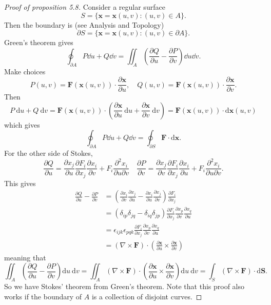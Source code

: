 \begin{proof}[Proof of proposition 5.8]
    Consider a regular surface 
    \[
        S = \{\mathbf{x}=\mathbf{x}(u,v): (u,v)\in A\}.
    \]
    Then the boundary is (see Analysis and Topology)
    \[
        \partial S = \{\mathbf{x}=\mathbf{x}(u,v): (u,v)\in \partial A\}.
    \]
    Green's theorem gives 
    \[
        \oint_{\partial A} P\dd u+Q\dd v = \iint_{A} \left( \frac{\partial Q}{\partial u}-\frac{\partial P}{\partial v}   \right)\dd u\dd v.
    \]
    Make choices 
    \[
        P(u,v) = \mathbf{F}(\mathbf{x}(u,v)) \cdot \frac{\partial \mathbf{x}}{\partial u},\quad Q(u,v) = \mathbf{F}(\mathbf{x}(u,v)) \cdot \frac{\partial \mathbf{x}}{\partial v}.  
    \]
    Then 
    \[
        P \mathrm{~d} u+Q \mathrm{~d} v=\mathbf{F}(\mathbf{x}(u, v)) \cdot\left(\frac{\partial \mathbf{x}}{\partial u} \mathrm{~d} u+\frac{\partial \mathbf{x}}{\partial v} \mathrm{~d} v\right)=\mathbf{F}(\mathbf{x}(u, v)) \cdot \mathrm{d} \mathbf{x}(u, v)
    \]
    which gives 
    \[
        \oint_{\partial A} P\dd u+Q\dd v = \oint_{\partial S} \mathbf{F} \cdot \mathrm{d}\mathbf{x}.
    \]
    For the other side of Stokes, 
    \[
        \frac{\partial Q}{\partial u}=\frac{\partial x_{j}}{\partial u} \frac{\partial F_{i}}{\partial x_{j}} \frac{\partial x_{i}}{\partial v}+F_{i} \frac{\partial^{2} x_{i}}{\partial u \partial v}\quad \frac{\partial P}{\partial v}=\frac{\partial x_{j}}{\partial v} \frac{\partial F_{i}}{\partial x_{j}} \frac{\partial x_{i}}{\partial u}+F_{i} \frac{\partial^{2} x_{i}}{\partial u \partial v}.
    \]
    This gives
    \begin{align*}
        \frac{\partial Q}{\partial u}-\frac{\partial P}{\partial v} &=\left(\frac{\partial x_{i}}{\partial v} \frac{\partial x_{j}}{\partial u}-\frac{\partial x_{i}}{\partial u} \frac{\partial x_{j}}{\partial v}\right) \frac{\partial F_{i}}{\partial x_{j}} \\
        &=\left(\delta_{i p} \delta_{j q}-\delta_{i q} \delta_{j p}\right) \frac{\partial F_{i}}{\partial x_{j}} \frac{\partial x_{p}}{\partial v} \frac{\partial x_{q}}{\partial u} \\
        &=\epsilon_{i j k} \epsilon_{p q k} \frac{\partial F_{i}}{\partial x_{j}} \frac{\partial x_{p}}{\partial v} \frac{\partial x_{q}}{\partial u} \\
        &=(\nabla \times \mathbf{F}) \cdot\left(\frac{\partial \mathbf{x}}{\partial u} \times \frac{\partial \mathbf{x}}{\partial v}\right)
    \end{align*}
    meaning that
    \[
        \iint_{A}\left(\frac{\partial Q}{\partial u}-\frac{\partial P}{\partial v}\right) \mathrm{d} u \mathrm{~d} v=\iint_{A}(\nabla \times \mathbf{F}) \cdot\left(\frac{\partial \mathbf{x}}{\partial u} \times \frac{\partial \mathbf{x}}{\partial v}\right) \mathrm{d} u \mathrm{~d} v=\int_{S}(\nabla \times \mathbf{F}) \cdot \mathrm{d} \mathbf{S} .
    \]
    So we have Stokes' theorem from Green's theorem. Note that this proof also works if the boundary of $A$ is a collection of disjoint curves.
\end{proof}